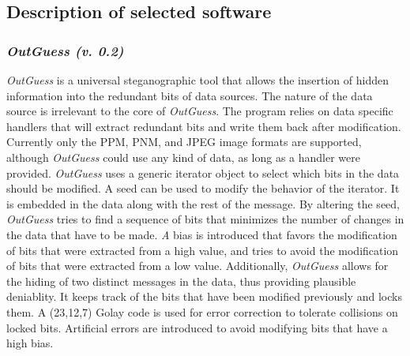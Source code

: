 \documentclass[11pt]{article}
\makeatletter
\newcommand{\subf}[2]{%
  {\small\begin{tabular}[t]{@{}c@{}}
  #1\\#2
  \end{tabular}}%
}
\makeatother
\begin{document}
% 

\subsection{Description of selected software}

\subsubsection{\textit{OutGuess (v. 0.2)}}
\textit{OutGuess} is a universal steganographic tool that allows the insertion of hidden information into the  
redundant  bits of data sources. The nature of the data source is irrelevant to the core of \textit{OutGuess}.  The program relies on  
data specific handlers that will extract redundant bits and write them back after modification. Currently only the PPM, 
PNM, and JPEG image formats are supported, although \textit{OutGuess} could use  any  kind  of data, as long as a handler were provided.
\textit{OutGuess} uses  a  generic  iterator  object  to  select  which bits in the data should be modified. A seed can be used 
to modify the behavior of the iterator. It is embedded in the data along with the rest of the message.  
By altering the seed, \textit{OutGuess} tries to find a sequence of bits that minimizes the number of changes in the data that have to be 
made. \textit A bias is introduced that favors the modification of bits that were extracted from a high value, and tries to avoid the 
modification of bits that were extracted from a low value.
Additionally, \textit{OutGuess}  allows  for the hiding of two distinct messages in the data, thus providing plausible 
deniablity.  It keeps track of the bits that have been modified previously and locks them. A (23,12,7)  Golay  code  
is used for error correction to tolerate collisions on locked bits.  Artificial errors are introduced to avoid modifying bits 
that have a high bias.
\end{document}
